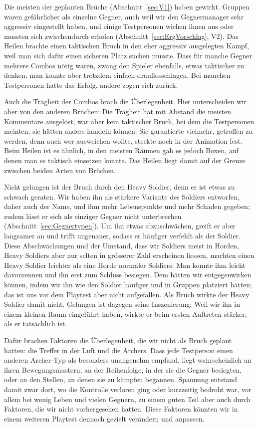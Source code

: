 \documentclass[../Main.tex]{subfiles}
\begin{document}
Die meisten der geplanten Brüche (Abschnitt~\ref{sec:V1}) haben gewirkt. Gruppen waren gefährlicher als einzelne Gegner, auch weil wir den Gegnermanager sehr aggressiv eingestellt haben, und einige Testpersonen wichen ihnen aus oder mussten sich zwischendurch erholen (Abschnitt~\ref{sec:ErgVorschlag}, V2). Das Heilen brachte einen taktischen Bruch in den eher aggressiv ausgelegten Kampf, weil man sich dafür einen sicheren Platz suchen musste. Dass für manche Gegner mehrere Combos nötig waren, zwang den Spieler ebenfalls, etwas taktischer zu denken; man konnte aber trotzdem einfach drauflosschlagen. Bei manchen Testpersonen hatte das Erfolg, andere zogen sich zurück.

Auch die Trägheit der Combos brach die Überlegenheit. Hier unterscheiden wir aber von den anderen Brüchen: Die Trägheit hat mit Abstand die meisten Kommentare ausgelöst, war aber kein taktischer Bruch, bei dem die Testpersonen meinten, sie hätten anders handeln können. Sie garantierte vielmehr, getroffen zu werden, denn auch wer ausweichen wollte, steckte noch in der Animation fest. Beim Heilen ist es ähnlich, in den meisten Räumen gab es jedoch Boxen, auf denen man es taktisch einsetzen konnte. Das Heilen liegt damit auf der Grenze zwischen beiden Arten von Brüchen.

Nicht gelungen ist der Bruch durch den Heavy Soldier, denn er ist etwas zu schwach geraten. Wir haben ihn als stärkere Variante des Soldiers entworfen, daher auch der Name, und ihm mehr Lebenspunkte und mehr Schaden gegeben; zudem lässt er sich als einziger Gegner nicht unterbrechen (Abschnitt~\ref{sec:Gegnertypen}). Um ihn etwas abzuschwächen, greift er aber langsamer an und trifft ungenauer, sodass er häufiger verfehlt als der Soldier. Diese Abschwächungen und der Umstand, dass wir Soldiers meist in Horden, Heavy Soldiers aber nur selten in grösserer Zahl erscheinen liessen, machten einen Heavy Soldier leichter als eine Horde normaler Soldiers. Man konnte ihm leicht davonrennen und ihn erst zum Schluss besiegen. Dem hätten wir entgegenwirken können, indem wir ihn wie den Soldier häufiger und in Gruppen platziert hätten; das ist uns vor dem Playtest aber nicht aufgefallen. Als Bruch wirkte der Heavy Soldier damit nicht. Gelungen ist dagegen seine Inszenierung: Weil wir ihn in einem kleinen Raum eingeführt haben, wirkte er beim ersten Auftreten stärker, als er tatsächlich ist.

Dafür brachen Faktoren die Überlegenheit, die wir nicht als Bruch geplant hatten: die Treffer in der Luft und die Archers. Dass jede Testperson einen anderen Archer-Typ als besonders unangenehm empfand, liegt wahrscheinlich an ihren Bewegungsmustern, an der Reihenfolge, in der sie die Gegner besiegten, oder an den Stellen, an denen sie zu kämpfen begannen. Spannung entstand damit zwar dort, wo die Kontrolle verloren ging oder kurzzeitig bedroht war, vor allem bei wenig Leben und vielen Gegnern, zu einem guten Teil aber auch durch Faktoren, die wir nicht vorhergesehen hatten. Diese Faktoren könnten wir in einem weiteren Playtest dennoch gezielt verändern und anpassen.
\end{document}
